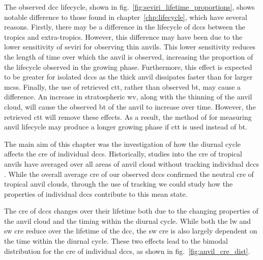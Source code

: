The observed \acrshort{dcc} lifecycle, shown in fig.~\ref{fig:seviri_lifetime_proportions}, shows notable difference to those found in chapter~\ref{chp:lifecycle}, which have several reasons.
Firstly, there may be a difference in the lifecycle of \acrshort{dcc}s between the tropics and extra-tropics.
However, this difference may have been due to the lower sensitivity of \acrshort{seviri} for observing thin anvils.
This lower sensitivity reduces the length of time over which the anvil is observed, increasing the proportion of the lifecycle observed in the growing phase.
Furthermore, this effect is expected to be greater for isolated \acrshort{dcc}s as the thick anvil dissipates faster than for larger \acrshort{mcs}s.
Finally, the use of retrieved \acrshort{ctt}, rather than observed \acrshort{bt}, may cause a difference.
An increase in stratospheric \acrshort{wv}, along with the thinning of the anvil cloud, will cause the observed \acrshort{bt} of the anvil to increase over time.
However, the retrieved \acrshort{ctt} will remove these effects.
As a result, the method of \citet{futyan_deep_2007} for measuring anvil lifecycle may produce a longer growing phase if \acrshort{ctt} is used instead of \acrshort{bt}.

The main aim of this chapter was the investigation of how the diurnal cycle affects the \acrshort{cre} of individual \acrshort{dcc}s.
Historically, studies into the \acrshort{cre} of tropical anvils have averaged over all areas of anvil cloud without tracking individual \acrshort{dcc}s \citep{ramanathan_cloud-radiative_1989, hartmann_effect_1992, stephens_cloudsat_2018}.
While the overall average \acrshort{cre} of our observed \acrshort{dcc}s confirmed the neutral \acrshort{cre} of tropical anvil clouds, through the use of tracking we could study how the properties of individual \acrshort{dcc}s contribute to this mean state.

The \acrshort{cre} of \acrshort{dcc}s changes over their lifetime both due to the changing properties of the anvil cloud and the timing within the diurnal cycle.
While both the \acrshort{lw} and \acrshort{sw} \acrshort{cre} reduce over the lifetime of the \acrshort{dcc}, the \acrshort{sw} \acrshort{cre} is also largely dependent on the time within the diurnal cycle.
These two effects lead to the bimodal distribution for the \acrshort{cre} of individual \acrshort{dcc}s, as shown in fig.~\ref{fig:anvil_cre_dist}.

